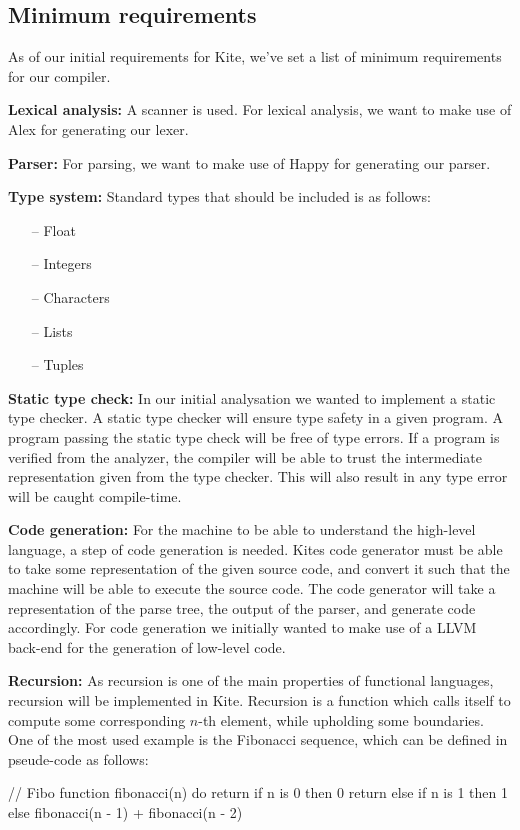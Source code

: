 
\subsection{Minimum requirements}
As of our initial requirements for Kite, we've set a list of minimum
requirements for our compiler.

\textbf{Lexical analysis:} A scanner is used. For lexical analysis, we
want to make use of Alex for generating our lexer.

\textbf{Parser:} For parsing, we want to make use of Happy for
generating our parser.

\textbf{Type system:} Standard types that should be included is as
follows:
\begin{itemize}
\item [--] Float
\item [--] Integers
\item [--] Characters
\item [--] Lists
\item [--] Tuples
\end{itemize}

\textbf{Static type check:} In our initial analysation we wanted to
implement a static type checker. A static type checker will ensure
type safety in a given program. A program passing the static type
check will be free of type errors. If a program is verified from the
analyzer, the compiler will be able to trust the intermediate
representation given from the type checker. This will also result in
any type error will be caught compile-time.

\textbf{Code generation:} For the machine to be able to understand the
high-level language, a step of code generation is needed. Kites code
generator must be able to take some representation of the given source
code, and convert it such that the machine will be able to execute the
source code. The code generator will take a representation of the
parse tree, the output of the parser, and generate code
accordingly. For code generation we initially wanted to make use of a
LLVM back-end for the generation of low-level code. 

\textbf{Recursion:} As recursion is one of the main properties of
functional languages, recursion will be implemented in Kite. Recursion
is a function which calls itself to compute some corresponding $n$-th
element, while upholding some boundaries. One of the most used example
is the Fibonacci sequence, which can be defined in pseude-code as
follows:
\begin{pseudo}
// Fibo
function fibonacci(n) do
  return if n is 0
    then 0
  return else if n is 1
    then 1
  else fibonacci(n - 1) + fibonacci(n - 2)
\end{pseudo}

